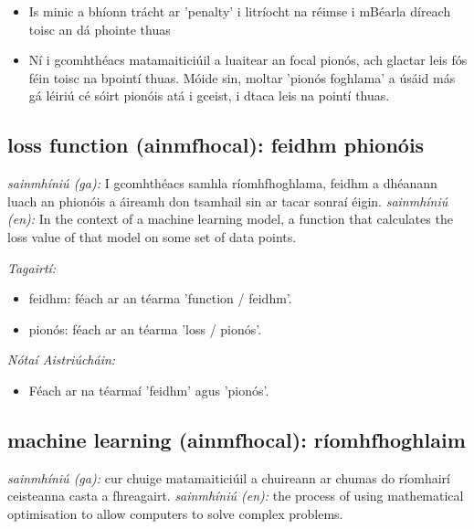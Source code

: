 \documentclass{article}
\begin{document}
\begin{itemize}
	\item Is minic a bhíonn trácht ar 'penalty' i litríocht na réimse i mBéarla díreach toisc an dá phointe thuas
	\item Ní i gcomhthéacs matamaiticiúil a luaitear an focal pionós, ach glactar leis fós féin toisc na bpointí thuas. Móide sin, moltar 'pionós foghlama' a úsáid más gá léiriú cé sóirt pionóis atá i gceist, i dtaca leis na pointí thuas.
\end{itemize}


\subsection*{loss function (ainmfhocal): feidhm phionóis} 
 \noindent \textit{sainmhíniú (ga):} I gcomhthéacs samhla ríomhfhoghlama, feidhm a dhéanann luach an phionóis a áireamh don tsamhail sin ar tacar sonraí éigin.
\newline\newline
 \noindent \textit{sainmhíniú (en):} In the context of a machine learning model, a function that calculates the loss value of that model on some set of data points.
\newline

 \noindent \textit{Tagairtí:}
\begin{itemize}
	\item feidhm: féach ar an téarma 'function / feidhm'.
	\item pionós: féach ar an téarma 'loss / pionós'.
\end{itemize}

 \noindent \textit{Nótaí Aistriúcháin:}
\begin{itemize}
	\item Féach ar na téarmaí 'feidhm' agus 'pionós'.
\end{itemize}


\subsection*{machine learning (ainmfhocal): ríomhfhoghlaim} 
 \noindent \textit{sainmhíniú (ga):} cur chuige matamaiticiúil a chuireann ar chumas do ríomhairí ceisteanna casta a fhreagairt.
\newline\newline
 \noindent \textit{sainmhíniú (en):} the process of using mathematical optimisation to allow computers to solve complex problems.
\newline
\end{document}
